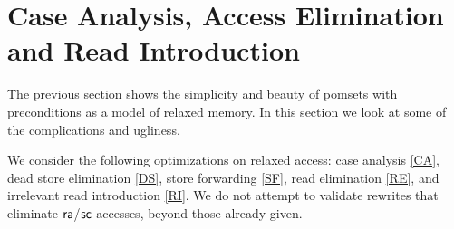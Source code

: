 \section{Case Analysis, Access Elimination and Read Introduction}
\label{sec:refine}

The previous section shows the simplicity and beauty of pomsets with
preconditions as a model of relaxed memory.  In this section we look at some
of the complications and ugliness.  

We consider the following optimizations on relaxed access: case analysis
\eqref{CA}, dead store elimination \eqref{DS}, store forwarding \eqref{SF},
read elimination \eqref{RE}, and irrelevant read introduction \eqref{RI}.  We
do not attempt to validate rewrites that eliminate ${\mathsf{ra}}$/${\mathsf{sc}}$
accesses, beyond those already given.

